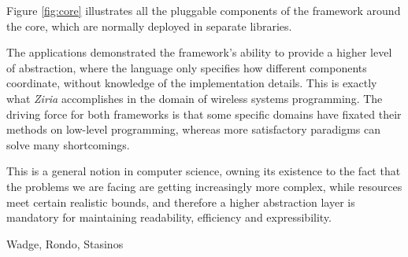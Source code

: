 \documentclass[sigplan,review,anonymous]{acmart}\settopmatter{printfolios=true,printacmref=false}
\begin{document}
Figure \ref{fig:core} illustrates all the pluggable components of the framework around the core, which are normally deployed in separate libraries.


The applications demonstrated the framework's ability to provide a higher level of abstraction, where the language only specifies how different components coordinate, without knowledge of the implementation details. This is exactly what \textit{Ziria} accomplishes in the domain of wireless systems programming\cite{ziria}. The driving force for both frameworks is that some specific domains have fixated their methods on low-level programming, whereas more satisfactory paradigms can solve many shortcomings.

This is a general notion in computer science, owning its existence to the fact that the problems we are facing are getting increasingly more complex, while resources meet certain realistic bounds, and therefore a higher abstraction layer is mandatory for maintaining readability, efficiency and expressibility.


\begin{acks}
Wadge, Rondo, Stasinos
\end{acks}



\end{document}
